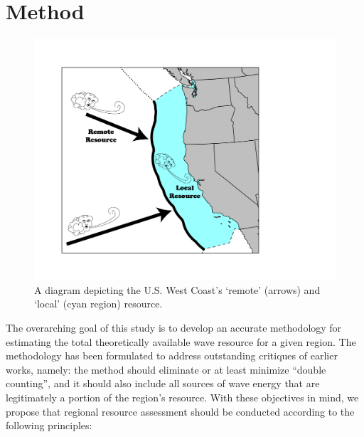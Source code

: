 \section{Method} \label{sec:method}

\begin{figure}[ht]
  \centering
\includegraphics[width=0.9\linewidth]{../diagram/EEZ_contour03_edit01.png}
  \caption{A diagram depicting the U.S. West Coast’s ‘remote’ (arrows) and ‘local’ (cyan region) resource.}
  \label{fig:diagram:west-eez}
\end{figure}

The overarching goal of this study is to develop an accurate methodology for estimating the total theoretically available wave resource for a given region. The methodology has been formulated to address outstanding critiques of earlier works, namely: the method should eliminate or at least minimize ``double counting'', and it should also include all sources of wave energy that are legitimately a portion of the region's resource. With these objectives in mind, we propose that regional resource assessment should be conducted according to the following principles:

